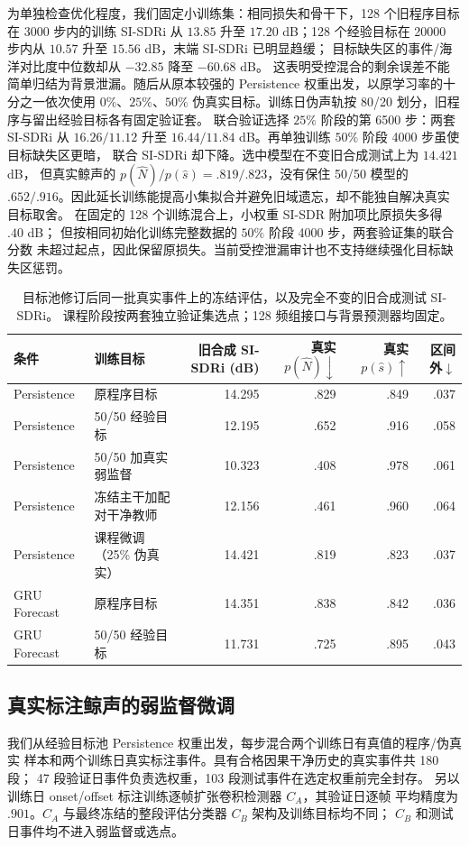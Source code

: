 \documentclass[conference]{IEEEtran}
\begin{document}
为单独检查优化程度，我们固定小训练集：相同损失和骨干下，128 个旧程序目标
在 3000 步内的训练 SI-SDRi 从 $13.85$ 升至 $17.20$ dB；128 个经验目标在
20000 步内从 $10.57$ 升至 $15.56$ dB，末端 SI-SDRi 已明显趋缓；
目标缺失区的事件/海洋对比度中位数却从 $-32.85$ 降至 $-60.68$ dB。
这表明受控混合的剩余误差不能简单归结为背景泄漏。随后从原本较强的
Persistence 权重出发，以原学习率的十分之一依次使用 $0\%$、$25\%$、$50\%$
伪真实目标。训练日伪声轨按 80/20 划分，旧程序与留出经验目标各有固定验证套。
联合验证选择 $25\%$ 阶段的第 6500 步：两套 SI-SDRi 从 $16.26/11.12$
升至 $16.44/11.84$ dB。再单独训练 $50\%$ 阶段 4000 步虽使目标缺失区更暗，
联合 SI-SDRi 却下降。选中模型在不变旧合成测试上为 $14.421$ dB，
但真实鲸声的 $p(\hat N)/p(\hat s)=.819/.823$，没有保住 50/50 模型的
$.652/.916$。因此延长训练能提高小集拟合并避免旧域遗忘，却不能独自解决真实目标取舍。
在固定的 128 个训练混合上，小权重 SI-SDR 附加项比原损失多得 $.40$ dB；
但按相同初始化训练完整数据的 $50\%$ 阶段 4000 步，两套验证集的联合分数
未超过起点，因此保留原损失。当前受控泄漏审计也不支持继续强化目标缺失区惩罚。

\begin{table}[t]
\caption{目标池修订后同一批真实事件上的冻结评估，以及完全不变的旧合成测试 SI-SDRi。
课程阶段按两套独立验证集选点；128 频组接口与背景预测器均固定。}
\label{tab:empirical}\centering\footnotesize
\begin{tabular}{llrrrr}
\toprule
条件 & 训练目标 & 旧合成 SI-SDRi (dB) & 真实 $p(\hat N)\downarrow$ & 真实 $p(\hat s)\uparrow$ & 区间外$\downarrow$\\
\midrule
Persistence & 原程序目标 &14.295&.829&.849&.037\\
Persistence & 50/50 经验目标 &12.195&.652&.916&.058\\
Persistence & 50/50 加真实弱监督 &10.323&.408&.978&.061\\
Persistence & 冻结主干加配对干净教师 &12.156&.461&.960&.064\\
Persistence & 课程微调（25\% 伪真实） &14.421&.819&.823&.037\\
GRU Forecast & 原程序目标 &14.351&.838&.842&.036\\
GRU Forecast & 50/50 经验目标 &11.731&.725&.895&.043\\
\bottomrule
\end{tabular}
\end{table}

\subsection{真实标注鲸声的弱监督微调}
我们从经验目标池 Persistence 权重出发，每步混合两个训练日有真值的程序/伪真实
样本和两个训练日真实标注事件。具有合格因果干净历史的真实事件共 180 段；
47 段验证日事件负责选权重，103 段测试事件在选定权重前完全封存。
另以训练日 onset/offset 标注训练逐帧扩张卷积检测器 $C_A$，其验证日逐帧
平均精度为 $.901$。$C_A$ 与最终冻结的整段评估分类器 $C_B$ 架构及训练目标均不同；
$C_B$ 和测试日事件均不进入弱监督或选点。
\end{document}
